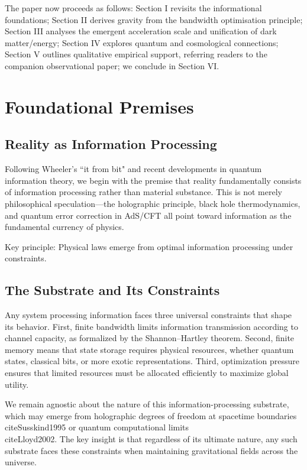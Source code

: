 \documentclass[twocolumn,prd,amsmath,amssymb,aps,superscriptaddress,nofootinbib]{revtex4-2}
\begin{document}
The paper now proceeds as follows: Section I revisits the informational foundations; Section II derives gravity from the bandwidth optimisation principle; Section III analyses the emergent acceleration scale and unification of dark matter/energy; Section IV explores quantum and cosmological connections; Section V outlines qualitative empirical support, referring readers to the companion observational paper; we conclude in Section VI.

\section{Foundational Premises}
\label{sec:foundations}

\subsection{Reality as Information Processing}

Following Wheeler's ``it from bit" and recent developments in quantum information theory, we begin with the premise that reality fundamentally consists of information processing rather than material substance. This is not merely philosophical speculation---the holographic principle, black hole thermodynamics, and quantum error correction in AdS/CFT all point toward information as the fundamental currency of physics.

Key principle: Physical laws emerge from optimal information processing under constraints.

\subsection{The Substrate and Its Constraints}

Any system processing information faces three universal constraints that shape its behavior. First, finite bandwidth limits information transmission according to channel capacity, as formalized by the Shannon--Hartley theorem. Second, finite memory means that state storage requires physical resources, whether quantum states, classical bits, or more exotic representations. Third, optimization pressure ensures that limited resources must be allocated efficiently to maximize global utility.

We remain agnostic about the nature of this information-processing substrate, which may emerge from holographic degrees of freedom at spacetime boundaries \\cite{Susskind1995} or quantum computational limits \\cite{Lloyd2002}. The key insight is that regardless of its ultimate nature, any such substrate faces these constraints when maintaining gravitational fields across the universe.
\end{document}
